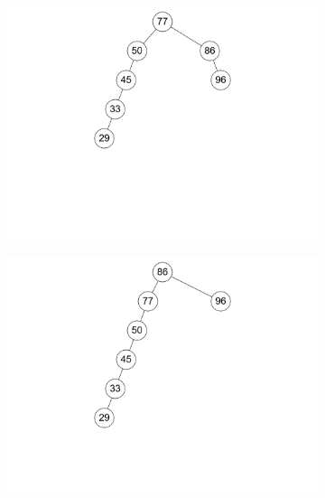\documentclass[11pt,a4paper]{article}
\begin{document}
\begin{loesung}
\begin{enumerate}
\begin{figure}[h!]
\begin{subfigure}[b]{0.3\textwidth}
                \centering
                \includegraphics[width=\textwidth]{img/2c_3}
            \end{subfigure}
            \begin{subfigure}[b]{0.3\textwidth}
                \centering
                \includegraphics[width=\textwidth]{img/2c_4}
            \end{subfigure}
            \begin{subfigure}[b]{0.3\textwidth}
                \centering

\end{subfigure}
\end{figure}
\end{enumerate}
\end{loesung}
\end{document}

